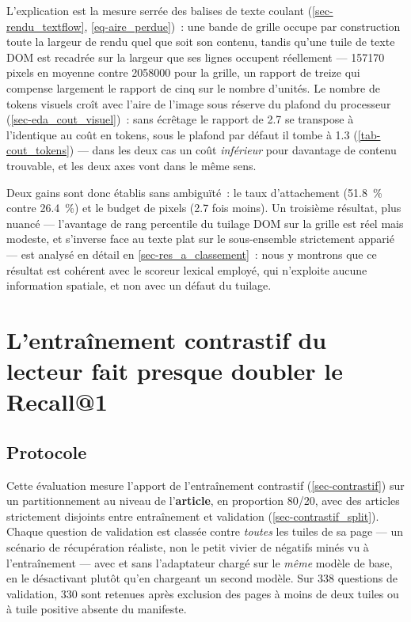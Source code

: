 L'explication est la mesure serrée des balises de texte coulant
(\cref{sec-rendu_textflow}, \cref{eq-aire_perdue})~: une bande de grille
occupe par construction toute la largeur de rendu quel que soit son contenu,
tandis qu'une tuile de texte DOM est recadrée sur la largeur que ses lignes
occupent réellement --- \num{157170} pixels en moyenne contre \num{2058000}
pour la grille, un rapport de treize qui compense largement le rapport de cinq
sur le nombre d'unités. Le nombre de tokens visuels croît avec l'aire de
l'image sous réserve du plafond du processeur (\cref{sec-eda_cout_visuel})~:
sans écrêtage le rapport de \num{2.7} se transpose à l'identique au coût en
tokens, sous le plafond par défaut il tombe à \num{1.3} (\cref{tab-cout_tokens})
--- dans les deux cas un coût \emph{inférieur} pour davantage de contenu
trouvable, et les deux axes vont dans le même sens.

\medskip
\noindent Deux gains sont donc établis sans ambiguïté~: le taux d'attachement
(\SI{51.8}{\percent} contre \SI{26.4}{\percent}) et le budget de pixels
(\num{2.7} fois moins). Un troisième résultat, plus nuancé --- l'avantage de
rang percentile du tuilage DOM sur la grille est réel mais modeste, et
s'inverse face au texte plat sur le sous-ensemble strictement apparié --- est
analysé en détail en \cref{sec-res_a_classement}~: nous y montrons que ce
résultat est cohérent avec le scoreur lexical employé, qui n'exploite aucune
information spatiale, et non avec un défaut du tuilage.

\section{L'entraînement contrastif du lecteur fait presque doubler le Recall@1}
\label{sec-res_ablation_b}

\subsection{Protocole}

Cette évaluation mesure l'apport de l'entraînement contrastif
(\cref{sec-contrastif}) sur un partitionnement au niveau de
l'\textbf{article}, en proportion \num{80}/\num{20}, avec des articles
strictement disjoints entre entraînement et validation
(\cref{sec-contrastif_split}). Chaque question de validation est classée
contre \emph{toutes} les tuiles de sa page --- un scénario de récupération
réaliste, non le petit vivier de négatifs minés vu à l'entraînement --- avec
et sans l'adaptateur chargé sur le \emph{même} modèle de base, en le
désactivant plutôt qu'en chargeant un second modèle. Sur \num{338} questions
de validation, \num{330} sont retenues après exclusion des pages à moins de
deux tuiles ou à tuile positive absente du manifeste.


